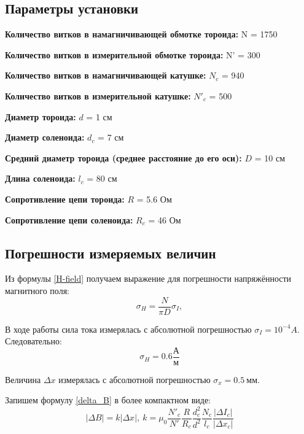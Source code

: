 \documentclass[14pt, a4paper,reqno]{article}
\begin{document}
    \subsection{Параметры установки}

        \textbf{Количество витков в намагничивающей обмотке тороида:} N = 1750

        \textbf{Количество витков в измерительной обмотке тороида:} N' = 300

        \textbf{Количество витков в намагничивающей катушке:} $N_c$ = 940
        
        \textbf{Количество витков в измерительной катушке:} $N'_c$ = 500

        \textbf{Диаметр тороида:} $d$ = 1 см

        \textbf{Диаметр соленоида:} $d_c$ = 7 см

        \textbf{Средний диаметр тороида (среднее расстояние до его оси):} $D$ = 10 см

        \textbf{Длина соленоида:} $l_c$ = 80 см

        \textbf{Сопротивление цепи тороида:} $R$ = 5.6 Ом

        \textbf{Сопротивление цепи соленоида:} $R_c$ = 46 Ом

    \subsection{Погрешности измеряемых величин}

    Из формулы \eqref{H-field} получаем выражение для погрешности напряжённости магнитного поля:
    \begin{equation*}
        \sigma_H =  \frac{N}{\pi D}\sigma_I,
    \end{equation*}

    В ходе работы сила тока измерялась с абсолютной погрешностью $\sigma_I = 10^{-4} A$. Следовательно:
    \begin{equation*}
        \sigma_H = 0.6 \frac{А}{м}
    \end{equation*}

    Величина $\Delta x$ измерялась с абсолютной погрешностью $\sigma_x = 0.5\ мм$.

    Запишем формулу \eqref{delta_B} в более компактном виде:
    \begin{equation*}
        |\Delta B| = k|\Delta x|,\ k = \mu_0 \frac{N'_c}{N'}\frac{R}{R_c}\frac{d_c^2}{d^2}\frac{N_c}{l_c}\frac{|\Delta I_c|}{|\Delta x_c|}
    \end{equation*}
\end{document}
